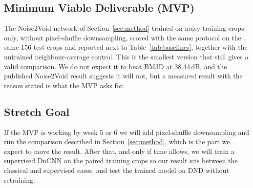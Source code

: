 \documentclass[11pt]{article}
\begin{document}
\subsection{Minimum Viable Deliverable (MVP)}
The Noise2Void network of Section~\ref{sec:method} trained on noisy training crops only,
without pixel-shuffle downsampling, scored with the same protocol on the same 156 test
crops and reported next to Table~\ref{tab:baselines}, together with the untrained
neighbour-average control. This is the smallest version that still gives a valid
comparison. We do not expect it to beat BM3D at 38.44\,dB, and the published Noise2Void
result suggests it will not, but a measured result with the reason stated is what the MVP
asks for.

\subsection{Stretch Goal}
If the MVP is working by week 5 or 6 we will add pixel-shuffle downsampling and run the
comparison described in Section~\ref{sec:method}, which is the part we expect to move the
result. After that, and only if time allows, we will train a supervised DnCNN
\citep{zhang2017dncnn} on the paired training crops so our result sits between the
classical and supervised cases, and test the trained model on DND \citep{plotz2017dnd}
without retraining.
\end{document}
